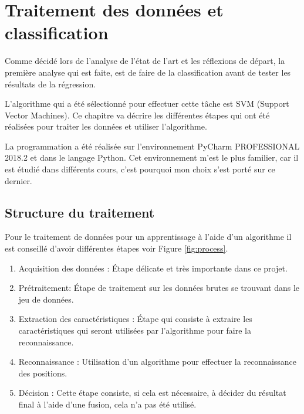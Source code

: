 \chapter{Traitement des données et classification}
Comme décidé lors de l'analyse de l'état de l'art et les réflexions de départ, la première analyse qui est faite, est de faire de la classification avant de tester les résultats de la régression. 

L'algorithme qui a été sélectionné pour effectuer cette tâche est SVM (Support Vector Machines). Ce chapitre va décrire les différentes étapes qui ont été réalisées pour traiter les données et utiliser l'algorithme.

La programmation a été réalisée sur l'environnement PyCharm PROFESSIONAL 2018.2 et dans le langage Python. Cet environnement m'est le plus familier, car il est étudié dans différents cours, c'est pourquoi mon choix s'est porté sur ce dernier. 


\section{Structure du traitement}
Pour le traitement de données pour un apprentissage à l'aide d'un algorithme il est conseillé d'avoir différentes étapes voir Figure \ref{fig:process}. 

\begin{enumerate} 
 \item Acquisition des données : Étape délicate et très importante dans ce projet.
 \item Prétraitement: Étape de traitement sur les données brutes se trouvant dans le jeu de données.
 \item Extraction des caractéristiques : Étape qui consiste à extraire les caractéristiques qui seront utilisées par l’algorithme pour faire la reconnaissance. 
 \item Reconnaissance : Utilisation d’un algorithme pour effectuer la reconnaissance des positions. 
 \item Décision :  Cette étape consiste, si cela est nécessaire, à décider du résultat final à l’aide d’une fusion, cela n'a pas été utilisé.
\end{enumerate}

